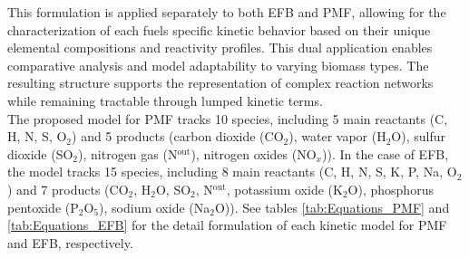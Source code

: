 \documentclass[preprint,12pt]{elsarticle}
\begin{document}
This formulation is applied separately to both EFB and PMF, allowing for the characterization of each fuels specific kinetic behavior based on their unique elemental compositions and reactivity profiles. This dual application enables comparative analysis and model adaptability to varying biomass types. The resulting structure supports the representation of complex reaction networks while remaining tractable through lumped kinetic terms.\\



The proposed model for PMF tracks 10 species, including 5 main reactants  (C, H, N, S, O$_2$) and 5 products (carbon dioxide (CO$_2$), water vapor (H$_2$O), sulfur dioxide (SO$_2$), nitrogen gas (N$^{\text{out}}$), nitrogen oxides (NO$_x$)). In the case of EFB, the model tracks 15 species, including 8 main reactants (C, H, N, S, K, P, Na, O$_2$) and 7 products (CO$_2$, H$_2$O, SO$_2$, N$^{\text{out}}$, potassium oxide (K$_2$O), phosphorus pentoxide (P$_2$O$_5$), sodium oxide (Na$_2$O)). See tables \ref{tab:Equations_PMF} and \ref{tab:Equations_EFB} for the detail formulation of each kinetic model for PMF and EFB, respectively. \\
\end{document}
